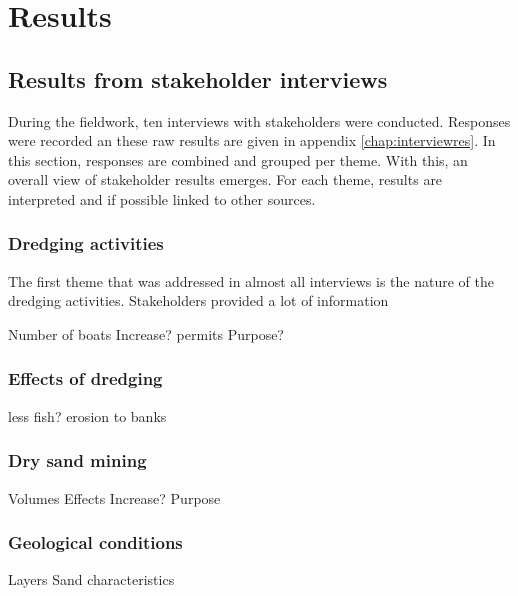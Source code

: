 \chapter{Results}
\label{chap:results}
\section{Results from stakeholder interviews}
During the fieldwork, ten interviews with stakeholders were conducted. Responses were recorded an these raw results are given in appendix \ref{chap:interviewres}. In this section, responses are combined and grouped per theme. With this, an overall view of stakeholder results emerges. For each theme, results are interpreted and if possible linked to other sources.

\subsection{Dredging activities}
The first theme that was addressed in almost all interviews is the nature of the dredging activities. Stakeholders provided a lot of information



Number of boats
Increase?
permits
Purpose?

\subsection{Effects of dredging}
less fish?
erosion to banks

\subsection{Dry sand mining}
Volumes
Effects
Increase?
Purpose

\subsection{Geological conditions}
Layers
Sand characteristics